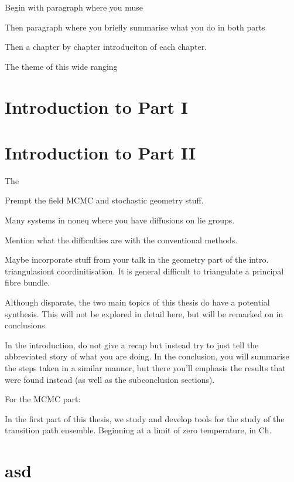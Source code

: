 \documentclass[]{cam-thesis}
\begin{document}
Begin with paragraph where you muse

Then paragraph where you briefly summarise what you do in both parts

Then a chapter by chapter introduciton of each chapter.




The theme of this  wide ranging

\section*{Introduction to Part I}

\section*{Introduction to Part II}

The 

Prempt the field MCMC and stochastic geometry stuff.

Many systems in noneq where you have diffusions on lie groups.

Mention what the difficulties are with the conventional methods.

Maybe incorporate stuff from your talk in the geometry part of the intro. triangulasiont coordinitisation. It is general difficult to triangulate a principal fibre bundle.

Although disparate, the two main topics of this thesis do have a potential synthesis. This will not be explored in detail here, but will be remarked on in conclusions.


{\color{red} In the introduction, do not give a recap but instead try to just tell the abbreviated story of what you are doing. In the conclusion, you will summarise the steps taken in a similar manner, but there you'll emphasis the results that were found instead (as well as the subconclusion sections)}.

For the MCMC part:

In the first part of this thesis, we study and develop tools for the study of the transition path ensemble. Beginning at a limit of zero temperature, in Ch.

\section*{asd}




\end{document}
